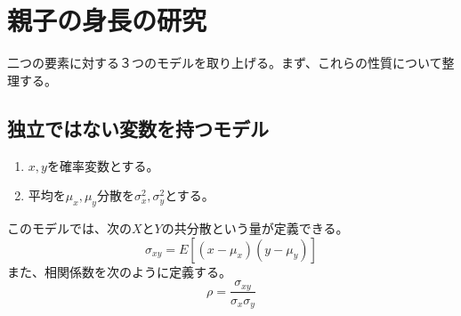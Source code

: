 \chapter{親子の身長の研究}

二つの要素に対する３つのモデルを取り上げる。まず、これらの性質について整理する。

\section{独立ではない変数を持つモデル}
\begin{enumerate}
 \item $x,y$を確率変数とする。
 \item 平均を$\mu_x,\mu_y$分散を$\sigma^2_x,\sigma^2_y$とする。
\end{enumerate}
このモデルでは、次の$X$と$Y$の共分散という量が定義できる。
\begin{equation*}
 \sigma_{xy} = E[(x-\mu_x)(y-\mu_y)]
\end{equation*}
また、相関係数を次のように定義する。
\begin{equation*}
 \rho = \frac{\sigma_{xy}}{\sigma_x\sigma_y}
\end{equation*}

